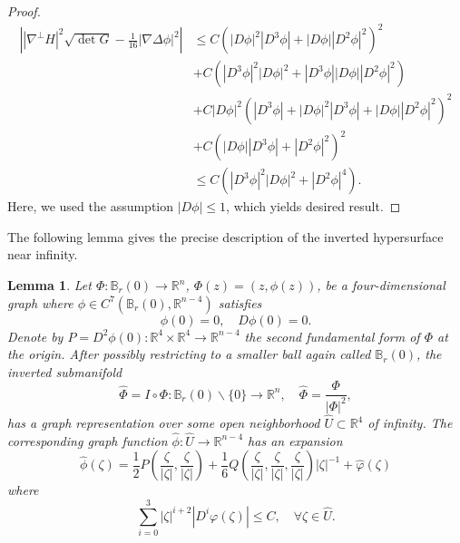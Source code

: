\documentclass[11pt,letterpaper]{amsart}
\newcommand{\bB}{\mathbb{B}}
\newcommand{\bR}{\mathbb{R}}
\newtheorem{lemma}[theorem]{Lemma}
\theoremstyle{definition}
\theoremstyle{remark}
\numberwithin{equation}{section}
\begin{document}
\begin{proof}
\begin{equation*}
\begin{split}
  \left||\nabla^\perp H|^2 \sqrt{\det G}-\frac{1}{16}|\nabla \Delta\phi|^2\right| &\leqslant C(|D\phi|^2|D^3\phi|+|D\phi||D^2\phi|^2)^2 \\
  &+C(|D^3\phi|^2|D\phi|^2+|D^3\phi||D\phi||D^2\phi|^2)\\
  &+C|D\phi|^2(|D^3\phi|+|D\phi|^2|D^3\phi|+|D\phi||D^2\phi|^2)^2\\
  &+C(|D\phi||D^3\phi|+|D^2\phi|^2)^2\\
  &\leqslant C(|D^3\phi|^2|D\phi|^2 +|D^2\phi|^4).
  \end{split}
\end{equation*}
Here, we used the assumption $|D\phi| \leqslant 1$, which yields desired result.
\end{proof}
The following lemma gives the precise description of the inverted hypersurface near infinity.
\begin{lemma}
    Let $\Phi: \mathbb{B}_{r}(0)\to \bR^n$, $\Phi(z)=(z,\phi(z))$, be a four-dimensional graph where $\phi\in C^7(\bB_r(0), \bR^{n-4})$ satisfies
    \begin{equation*}
        \phi(0)=0, \quad D\phi(0)=0.
    \end{equation*}
    Denote by $P=D^2\phi(0):\bR^4\times \bR^4\to \bR^{n-4}$ the second fundamental form of $\Phi$ at the origin. After possibly restricting to a smaller ball again called $\mathbb{B}_r(0)$, the inverted submanifold
    \begin{equation*}
        \hat{\Phi}=I\circ \Phi: \bB_r(0)\backslash \{0\}\to \bR^n, \quad \hat{\Phi}=\frac{\Phi}{|\Phi|^2},
    \end{equation*}
    has a graph representation over some open neighborhood $\hat{U}\subset \bR^4$ of infinity. The corresponding graph function $\hat{\phi}:\hat{U}\to \bR^{n-4}$ has an expansion
    \begin{equation}
        \hat{\phi}(\zeta)=\frac{1}{2}P\left(\frac{\zeta}{|\zeta|},\frac{\zeta}{|\zeta|} \right)+\frac{1}{6}Q\left(\frac{\zeta}{|\zeta|},\frac{\zeta}{|\zeta|},\frac{\zeta}{|\zeta|} \right)|\zeta|^{-1}+\hat{\varphi}(\zeta)
    \end{equation}
where
\begin{equation*}
    \sum_{i=0}^{3} |\zeta|^{i+2}|D^{i}\varphi(\zeta)|\leq C, \quad \forall \zeta\in \hat{U}.
\end{equation*}
\end{lemma}
\end{document}
